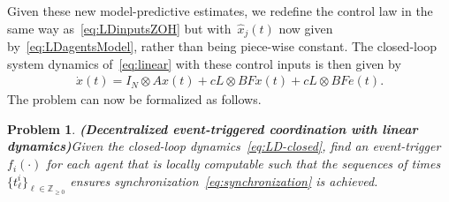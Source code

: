\documentclass{autart}
\newtheorem{problem}[theorem]{Problem}
\newcommand{\integernonnegative}{\mathbb{Z}_{\ge 0}}
\renewcommand{\hat}{\widehat}
\newcommand{\longthmtitle}[1]{\mbox{}\textup{\textbf{(#1)}}}
\begin{document}
Given these new model-predictive estimates, we redefine the control
law in the same way as~\eqref{eq:LDinputsZOH} but
with~$\hat{x}_j(t)$ now given by~\eqref{eq:LDagentsModel}, rather than
being piece-wise constant.  The closed-loop system dynamics
of~\eqref{eq:linear} with these control inputs is then given by
\begin{align}\label{eq:LD-closed}
  \dot{x}(t) = I_N \otimes A x(t) + c L \otimes B F x(t) + c L \otimes
  B F e(t) . 
\end{align}
The problem can now be formalized as follows.

\begin{problem}\longthmtitle{Decentralized event-triggered
    coordination with linear dynamics}\label{pr:linear} 
  Given the closed-loop dynamics~\eqref{eq:LD-closed}, find an
  event-trigger~$f_i(\cdot)$ for each agent that is locally computable
  such that the sequences of times~$\{t_\ell^i\}_{\ell \in
    \integernonnegative}$ ensures
  synchronization~\eqref{eq:synchronization} is achieved.
\end{problem}

\end{document}
